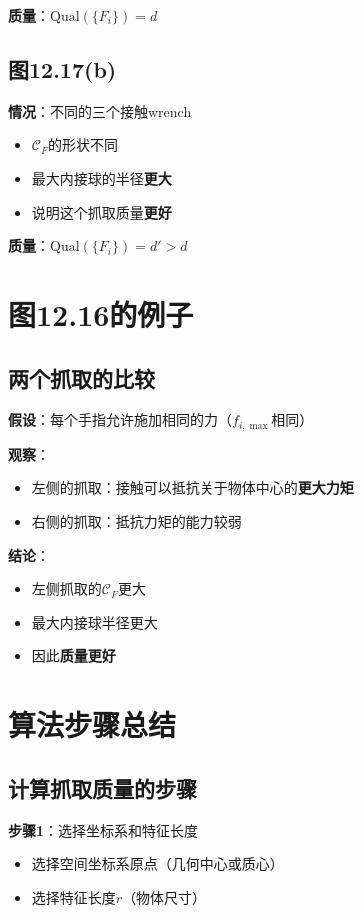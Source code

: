 \documentclass[12pt,a4paper]{article}
\begin{document}
\textbf{质量}：$\text{Qual}(\{F_i\}) = d$

\subsection{图12.17(b)}

\textbf{情况}：不同的三个接触wrench

\begin{itemize}
\item $\mathcal{C}_F$的形状不同
\item 最大内接球的半径\textbf{更大}
\item 说明这个抓取质量\textbf{更好}
\end{itemize}

\textbf{质量}：$\text{Qual}(\{F_i\}) = d' > d$

\section{图12.16的例子}

\subsection{两个抓取的比较}

\textbf{假设}：每个手指允许施加相同的力（$f_{i,\max}$相同）

\textbf{观察}：
\begin{itemize}
\item 左侧的抓取：接触可以抵抗关于物体中心的\textbf{更大力矩}
\item 右侧的抓取：抵抗力矩的能力较弱
\end{itemize}

\textbf{结论}：
\begin{itemize}
\item 左侧抓取的$\mathcal{C}_F$更大
\item 最大内接球半径更大
\item 因此\textbf{质量更好}
\end{itemize}

\section{算法步骤总结}

\subsection{计算抓取质量的步骤}

\textbf{步骤1}：选择坐标系和特征长度
\begin{itemize}
\item 选择空间坐标系原点（几何中心或质心）
\item 选择特征长度$r$（物体尺寸）
\end{itemize}
\end{document}
